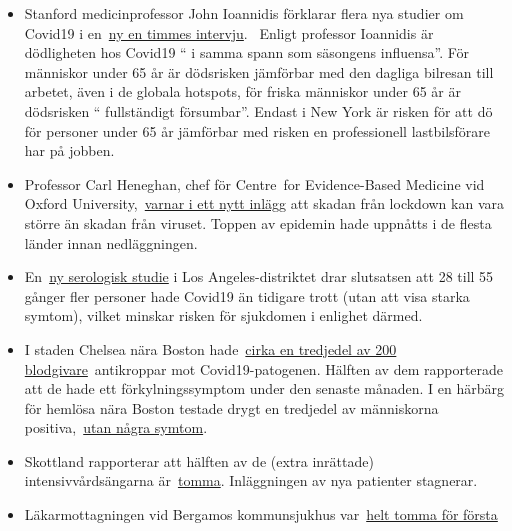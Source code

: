 \begin{itemize}
\tightlist
\item
  Stanford medicinprofessor John Ioannidis förklarar flera nya studier
  om Covid19 i en~\href{https://www.youtube.com/watch?v=cwPqmLoZA4s}{ny
  en timmes intervju}.~ Enligt professor Ioannidis är dödligheten hos
  Covid19 `` i samma spann som säsongens influensa''. För människor
  under 65 år är dödsrisken jämförbar med den dagliga bilresan till
  arbetet, även i de globala hotspots, för friska människor under 65 år
  är dödsrisken `` fullständigt försumbar''. Endast i New York är risken
  för att dö för personer under 65 år jämförbar med risken en
  professionell lastbilsförare har på jobben.
\item
  Professor Carl Heneghan, chef för Centre~for Evidence-Based Medicine
  vid Oxford
  University,~\href{https://news.yahoo.com/lockdown-damage-outweighs-coronavirus-warning-121940675.html}{varnar
  i ett nytt inlägg} att skadan från lockdown kan vara större än skadan
  från viruset. Toppen av epidemin hade uppnåtts i de flesta länder
  innan nedläggningen.
\item
  En~\href{http://publichealth.lacounty.gov/phcommon/public/media/mediapubhpdetail.cfm?prid=2328}{ny
  serologisk studie} i Los Angeles-distriktet drar slutsatsen att 28
  till 55 gånger fler personer hade Covid19 än tidigare trott (utan att
  visa starka symtom), vilket minskar risken för sjukdomen i enlighet
  därmed.
\item
  I staden Chelsea nära Boston
  hade~\href{https://archive.is/20200418222442/https://www.bostonglobe.com/2020/04/17/business/nearly-third-200-blood-samples-taken-chelsea-show-exposure-coronavirus/}{cirka
  en tredjedel av 200 blodgivare}~antikroppar mot Covid19-patogenen.
  Hälften av dem rapporterade att de hade ett förkylningssymptom under
  den senaste månaden. I en härbärg för hemlösa nära Boston testade
  drygt en tredjedel av människorna
  positiva,~\href{https://www.wsbtv.com/news/trending/coronavirus-cdc-reviewing-stunning-universal-testing-results-boston-homeless-shelter/ZADQ45HCAZEVJAZA3OTCUR7M6M/}{utan
  några symtom}.
\item
  Skottland rapporterar att hälften av de (extra inrättade)
  intensivvårdsängarna
  är~\href{https://www.heraldscotland.com/news/18377095.coronavirus-scotland-half-icu-beds-empty/}{tomma}.
  Inläggningen av nya patienter stagnerar.
\item
  Läkarmottagningen vid Bergamos kommunsjukhus
  var~\href{https://orf.at/stories/3162642/}{helt tomma för första
}
\end{itemize}
